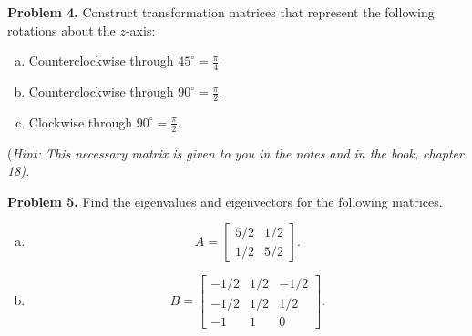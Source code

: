 \documentclass[12pt]{report} %
\theoremstyle{definition}
\begin{document}
\noindent\textbf{Problem 4.} Construct transformation matrices that represent the following rotations about the $z$-axis:
\begin{enumerate}[(a)]
    \item Counterclockwise through $45^\circ = \frac{\pi}{4}$.
    \item Counterclockwise through $90^\circ = \frac{\pi}{2}$.
    \item Clockwise through $90^\circ = \frac{\pi}{2}$.
\end{enumerate}
(\emph{Hint: This necessary matrix is given to you in the notes and in the book, chapter 18).}
\pagebreak

\noindent\textbf{Problem 5.} Find the eigenvalues and eigenvectors for the following matrices.
\begin{enumerate}[(a)]
    \item \[
    A= \begin{bmatrix} 5/2 & 1/2 \\ 1/2 & 5/2 \end{bmatrix}.
    \]
    \item \[
    B= \begin{bmatrix} -1/2 & 1/2 & -1/2 \\ -1/2 & 1/2 & 1/2 \\ -1 & 1 & 0\end{bmatrix}.
    \]
\end{enumerate}
\end{document}
